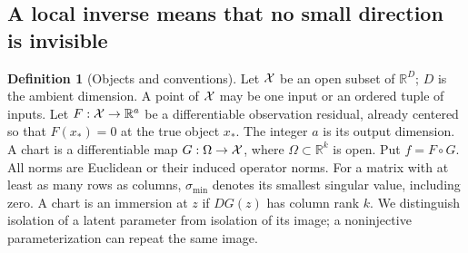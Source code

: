 \documentclass[11pt,a4paper]{article}
\theoremstyle{definition}
\theoremstyle{definition}
\newtheorem{definition}[theorem]{Definition}
\theoremstyle{remark}\newtheorem{remark}[theorem]{Remark}
\newcommand{\R}{\mathbb R}\newcommand{\Prob}{\mathbb P}\newcommand{\E}{\mathbb E}
\newcommand{\smin}{\sigma_{\min}}\newcommand{\smax}{\sigma_{\max}}
\begin{document}
\subsection{A local inverse means that no small direction is invisible}

\begin{definition}[Objects and conventions]
Let $\mathcal X$ be an open subset of $\R^D$; $D$ is the ambient dimension. A point of $\mathcal X$ may be one input or an ordered tuple of inputs. Let $F:\XX\to\R^a$ be a differentiable observation residual, already centered so that $F(x_*)=0$ at the true object $x_*$. The integer $a$ is its output dimension. A chart is a differentiable map $G:\Omega\to\mathcal X$, where $\Omega\subset\R^k$ is open. Put $f=F\circ G$. All norms are Euclidean or their induced operator norms. For a matrix with at least as many rows as columns, $\smin$ denotes its smallest singular value, including zero. A chart is an immersion at $z$ if $DG(z)$ has column rank $k$. We distinguish isolation of a latent parameter from isolation of its image; a noninjective parameterization can repeat the same image.
\end{definition}
\end{document}
